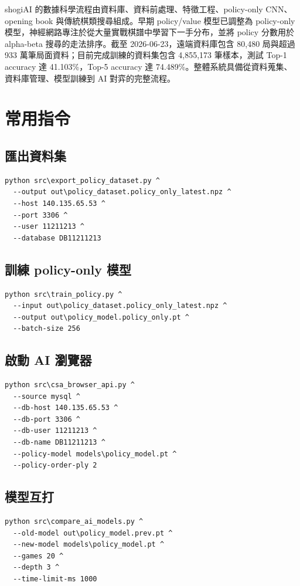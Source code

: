 \documentclass[12pt,a4paper,fontset=none]{ctexart}
\begin{document}
shogiAI 的數據科學流程由資料庫、資料前處理、特徵工程、policy-only CNN、opening book 與傳統棋類搜尋組成。早期 policy/value 模型已調整為 policy-only 模型，神經網路專注於從大量實戰棋譜中學習下一手分布，並將 policy 分數用於 alpha-beta 搜尋的走法排序。截至 2026-06-23，遠端資料庫包含 80,480 局與超過 933 萬筆局面資料；目前完成訓練的資料集包含 4,855,173 筆樣本，測試 Top-1 accuracy 達 41.103\%，Top-5 accuracy 達 74.489\%。整體系統具備從資料蒐集、資料庫管理、模型訓練到 AI 對弈的完整流程。

\appendix
\section{常用指令}

\subsection{匯出資料集}

\begin{lstlisting}[style=cmd]
python src\export_policy_dataset.py ^
  --output out\policy_dataset.policy_only_latest.npz ^
  --host 140.135.65.53 ^
  --port 3306 ^
  --user 11211213 ^
  --database DB11211213
\end{lstlisting}

\subsection{訓練 policy-only 模型}

\begin{lstlisting}[style=cmd]
python src\train_policy.py ^
  --input out\policy_dataset.policy_only_latest.npz ^
  --output out\policy_model.policy_only.pt ^
  --batch-size 256
\end{lstlisting}

\subsection{啟動 AI 瀏覽器}

\begin{lstlisting}[style=cmd]
python src\csa_browser_api.py ^
  --source mysql ^
  --db-host 140.135.65.53 ^
  --db-port 3306 ^
  --db-user 11211213 ^
  --db-name DB11211213 ^
  --policy-model models\policy_model.pt ^
  --policy-order-ply 2
\end{lstlisting}

\subsection{模型互打}

\begin{lstlisting}[style=cmd]
python src\compare_ai_models.py ^
  --old-model out\policy_model.prev.pt ^
  --new-model models\policy_model.pt ^
  --games 20 ^
  --depth 3 ^
  --time-limit-ms 1000
\end{lstlisting}
\end{document}
